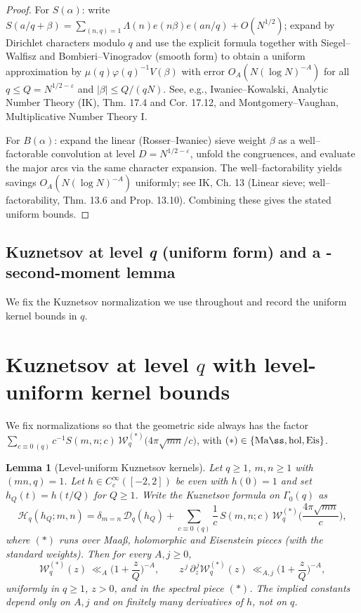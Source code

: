 \documentclass[11pt]{article}
\newtheorem{lemma}{Lemma}[part]
\theoremstyle{definition}
\theoremstyle{remark}
\numberwithin{equation}{part}
\begin{document}
\begin{proof}
	For $S(\alpha)$: write $S(a/q+\beta)=\sum_{(n,q)=1}\Lambda(n)e(n\beta)e(an/q)+O(N^{1/2})$; expand by Dirichlet characters modulo $q$ and use the explicit formula together with Siegel--Walfisz and Bombieri--Vinogradov (smooth form) to obtain a uniform approximation by $\mu(q)\varphi(q)^{-1}V(\beta)$ with error $O_A(N(\log N)^{-A})$ for all $q\le Q=N^{1/2-\varepsilon}$ and $|\beta|\le Q/(qN)$. See, e.g., Iwaniec--Kowalski, Analytic Number Theory (IK), Thm. 17.4 and Cor. 17.12, and Montgomery--Vaughan, Multiplicative Number Theory I.

	For $B(\alpha)$: expand the linear (Rosser--Iwaniec) sieve weight $\beta$ as a well--factorable convolution at level $D=N^{1/2-\varepsilon}$, unfold the congruences, and evaluate the major arcs via the same character expansion. The well--factorability yields savings $O_A(N(\log N)^{-A})$ uniformly; see IK, Ch. 13 (Linear sieve; well--factorability, Thm. 13.6 and Prop. 13.10). Combining these gives the stated uniform bounds.
\end{proof}

\subsection{Kuznetsov at level \textit q (uniform form) and a \textDelta-second-moment lemma}

We fix the Kuznetsov normalization we use throughout and record the uniform kernel bounds in $q$.

\section{Kuznetsov at level $q$ with level-uniform kernel bounds}

We fix normalizations so that the geometric side always has the factor
$\sum_{c\equiv 0\ (q)} c^{-1} S(m,n;c)\,\mathcal W^{(*)}_{q}\!\big(4\pi\sqrt{mn}/c\big)$,
with $(*)\in\{\mathrm{Ma\ss},\mathrm{hol},\mathrm{Eis}\}$.

\begin{lemma}[Level-uniform Kuznetsov kernels]\label{lem:kuznetsov-uniform}
	Let $q\ge1$, $m,n\ge1$ with $(mn,q)=1$.
	Let $h\in C_c^\infty([-2,2])$ be even with $h(0)=1$ and set $h_Q(t)=h(t/Q)$ for $Q\ge1$.
	Write the Kuznetsov formula on $\Gamma_0(q)$ as
	\[
		\mathcal H_q(h_Q;m,n)
		=\delta_{m=n}\,\mathcal D_q(h_Q)
		+\sum_{c\equiv 0\ (q)} \frac{1}{c}\,S(m,n;c)\,\mathcal W_q^{(*)}\!\Big(\frac{4\pi\sqrt{mn}}{c}\Big),
	\]
	where $(*)$ runs over Maa\ss, holomorphic and Eisenstein pieces (with the standard weights).
	Then for every $A,j\ge0$,
	\[
		\mathcal W_q^{(*)}(z)\ \ll_A \Big(1+\frac{z}{Q}\Big)^{-A},
		\qquad
		z^{\,j}\,\partial_z^{\,j}\mathcal W_q^{(*)}(z)\ \ll_{A,j} \Big(1+\frac{z}{Q}\Big)^{-A},
	\]
	uniformly in $q\ge1$, $z>0$, and in the spectral piece $(*)$.
	The implied constants depend only on $A,j$ and on finitely many derivatives of $h$, not on $q$.
\end{lemma}
\end{document}

